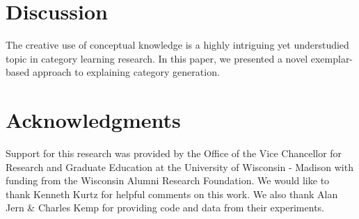 \documentclass[10pt,letterpaper]{article}
\begin{document}


\section{Discussion}

The creative use of conceptual knowledge is a highly intriguing yet understudied topic in category learning research. In this paper, we presented a novel exemplar-based approach to explaining category generation.

\section{Acknowledgments}
Support for this research was provided by the Office of the Vice Chancellor for Research and Graduate Education at the University of Wisconsin - Madison with funding from the Wisconsin Alumni Research Foundation. We would like to thank Kenneth Kurtz for helpful comments on this work. We also thank Alan Jern \& Charles Kemp for providing code and data from their experiments.




\setlength{\bibleftmargin}{.025in}
\setlength{\bibindent}{-\bibleftmargin}

\end{document}
